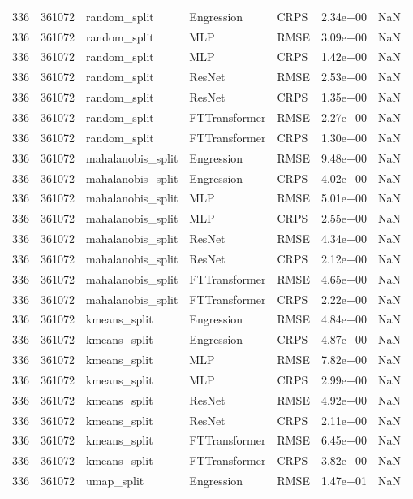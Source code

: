 \begin{tabular}{rrlllrr}
336 & 361072 & random\_split & Engression & CRPS & 2.34e+00 & NaN \\
336 & 361072 & random\_split & MLP & RMSE & 3.09e+00 & NaN \\
336 & 361072 & random\_split & MLP & CRPS & 1.42e+00 & NaN \\
336 & 361072 & random\_split & ResNet & RMSE & 2.53e+00 & NaN \\
336 & 361072 & random\_split & ResNet & CRPS & 1.35e+00 & NaN \\
336 & 361072 & random\_split & FTTransformer & RMSE & 2.27e+00 & NaN \\
336 & 361072 & random\_split & FTTransformer & CRPS & 1.30e+00 & NaN \\
336 & 361072 & mahalanobis\_split & Engression & RMSE & 9.48e+00 & NaN \\
336 & 361072 & mahalanobis\_split & Engression & CRPS & 4.02e+00 & NaN \\
336 & 361072 & mahalanobis\_split & MLP & RMSE & 5.01e+00 & NaN \\
336 & 361072 & mahalanobis\_split & MLP & CRPS & 2.55e+00 & NaN \\
336 & 361072 & mahalanobis\_split & ResNet & RMSE & 4.34e+00 & NaN \\
336 & 361072 & mahalanobis\_split & ResNet & CRPS & 2.12e+00 & NaN \\
336 & 361072 & mahalanobis\_split & FTTransformer & RMSE & 4.65e+00 & NaN \\
336 & 361072 & mahalanobis\_split & FTTransformer & CRPS & 2.22e+00 & NaN \\
336 & 361072 & kmeans\_split & Engression & RMSE & 4.84e+00 & NaN \\
336 & 361072 & kmeans\_split & Engression & CRPS & 4.87e+00 & NaN \\
336 & 361072 & kmeans\_split & MLP & RMSE & 7.82e+00 & NaN \\
336 & 361072 & kmeans\_split & MLP & CRPS & 2.99e+00 & NaN \\
336 & 361072 & kmeans\_split & ResNet & RMSE & 4.92e+00 & NaN \\
336 & 361072 & kmeans\_split & ResNet & CRPS & 2.11e+00 & NaN \\
336 & 361072 & kmeans\_split & FTTransformer & RMSE & 6.45e+00 & NaN \\
336 & 361072 & kmeans\_split & FTTransformer & CRPS & 3.82e+00 & NaN \\
336 & 361072 & umap\_split & Engression & RMSE & 1.47e+01 & NaN \\

\end{tabular}
